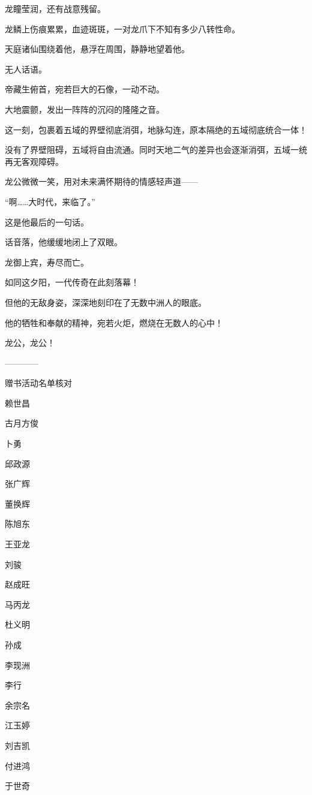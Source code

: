 \begin{this_body}
龙瞳莹润，还有战意残留。

龙鳞上伤痕累累，血迹斑斑，一对龙爪下不知有多少八转性命。

天庭诸仙围绕着他，悬浮在周围，静静地望着他。

无人话语。

帝藏生俯首，宛若巨大的石像，一动不动。

大地震颤，发出一阵阵的沉闷的隆隆之音。

这一刻，包裹着五域的界壁彻底消弭，地脉勾连，原本隔绝的五域彻底统合一体！

没有了界壁阻碍，五域将自由流通。同时天地二气的差异也会逐渐消弭，五域一统再无客观障碍。

龙公微微一笑，用对未来满怀期待的情感轻声道——

“啊……大时代，来临了。”

这是他最后的一句话。

话音落，他缓缓地闭上了双眼。

龙御上宾，寿尽而亡。

如同这夕阳，一代传奇在此刻落幕！

但他的无敌身姿，深深地刻印在了无数中洲人的眼底。

他的牺牲和奉献的精神，宛若火炬，燃烧在无数人的心中！

龙公，龙公！

------------

赠书活动名单核对

赖世昌

古月方俊

卜勇

邱政源

张广辉

董换辉

陈旭东

王亚龙

刘骏

赵成旺

马丙龙

杜义明

孙成

李现洲

李行

余宗名

江玉婷

刘吉凯

付进鸿

于世奇


\end{this_body}
